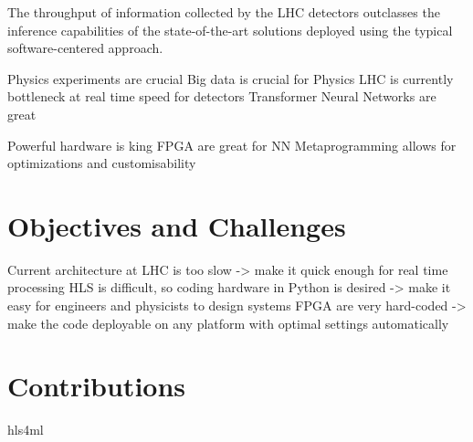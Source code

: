 The throughput of information collected by the LHC detectors outclasses the inference capabilities of the state-of-the-art solutions
deployed using the typical software-centered approach\cite{?}.

Physics experiments are crucial
Big data is crucial for Physics
LHC is currently bottleneck at real time speed for detectors
Transformer Neural Networks are great

Powerful hardware is king
FPGA are great for NN
Metaprogramming allows for optimizations and customisability

\section{Objectives and Challenges}
Current architecture at LHC is too slow -> make it quick enough for real time processing
HLS is difficult, so coding hardware in Python is desired -> make it easy for engineers and physicists to design systems
FPGA are very hard-coded -> make the code deployable on any platform with optimal settings automatically

\section{Contributions}
hls4ml
